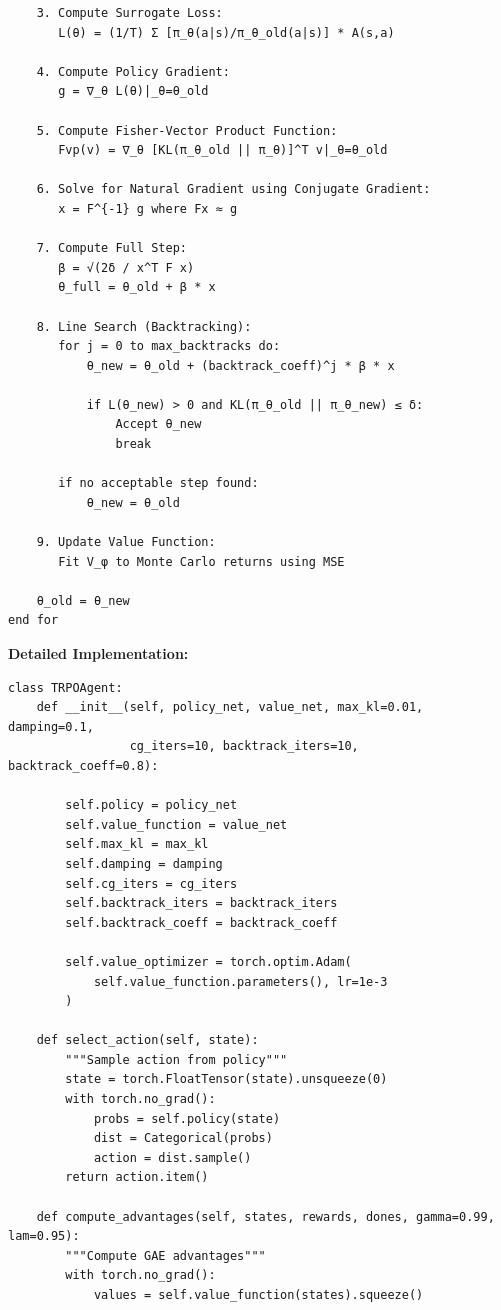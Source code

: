 \documentclass[12pt]{article}
\begin{document}
{{\begin{verbatim}
    3. Compute Surrogate Loss:
       L(θ) = (1/T) Σ [π_θ(a|s)/π_θ_old(a|s)] * A(s,a)

    4. Compute Policy Gradient:
       g = ∇_θ L(θ)|_θ=θ_old

    5. Compute Fisher-Vector Product Function:
       Fvp(v) = ∇_θ [KL(π_θ_old || π_θ)]^T v|_θ=θ_old

    6. Solve for Natural Gradient using Conjugate Gradient:
       x = F^{-1} g where Fx ≈ g

    7. Compute Full Step:
       β = √(2δ / x^T F x)
       θ_full = θ_old + β * x

    8. Line Search (Backtracking):
       for j = 0 to max_backtracks do:
           θ_new = θ_old + (backtrack_coeff)^j * β * x

           if L(θ_new) > 0 and KL(π_θ_old || π_θ_new) ≤ δ:
               Accept θ_new
               break

       if no acceptable step found:
           θ_new = θ_old

    9. Update Value Function:
       Fit V_φ to Monte Carlo returns using MSE

    θ_old = θ_new
end for
\end{verbatim}

\textbf{Detailed Implementation:}

\begin{verbatim}
class TRPOAgent:
    def __init__(self, policy_net, value_net, max_kl=0.01, damping=0.1, 
                 cg_iters=10, backtrack_iters=10, backtrack_coeff=0.8):
        
        self.policy = policy_net
        self.value_function = value_net
        self.max_kl = max_kl
        self.damping = damping
        self.cg_iters = cg_iters
        self.backtrack_iters = backtrack_iters
        self.backtrack_coeff = backtrack_coeff

        self.value_optimizer = torch.optim.Adam(
            self.value_function.parameters(), lr=1e-3
        )

    def select_action(self, state):
        """Sample action from policy"""
        state = torch.FloatTensor(state).unsqueeze(0)
        with torch.no_grad():
            probs = self.policy(state)
            dist = Categorical(probs)
            action = dist.sample()
        return action.item()

    def compute_advantages(self, states, rewards, dones, gamma=0.99, lam=0.95):
        """Compute GAE advantages"""
        with torch.no_grad():
            values = self.value_function(states).squeeze()


\end{verbatim}}}
\end{document}

